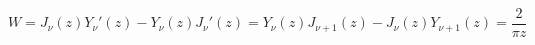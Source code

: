 \documentclass[12pt]{article}
\begin{document}
\begin{displaymath}
W = J_\nu(z)Y_\nu'(z) - Y_\nu(z)J_\nu'(z)
  = Y_\nu(z)J_{\nu+1}(z) - J_\nu(z)Y_{\nu+1}(z)
  = \frac{2}{\pi z}
\end{displaymath}
\end{document}
